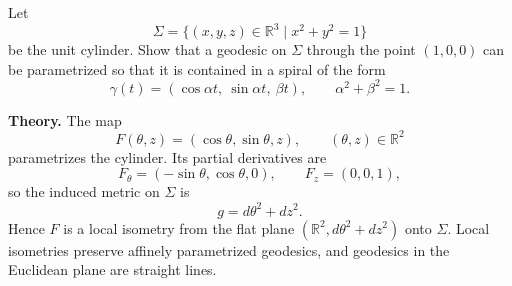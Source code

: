 \begin{problem}
\label{prob:cp-vii-0066}
Let
	\[
	\Sigma=\{(x,y,z)\in\mathbb R^3\mid x^2+y^2=1\}
	\]
	be the unit cylinder. Show that a geodesic on $\Sigma$ through the point $(1,0,0)$
	can be parametrized so that it is contained in a spiral of the form
	\[
	\gamma(t)=(\cos\alpha t,\ \sin\alpha t,\ \beta t),
	\qquad \alpha^2+\beta^2=1.
	\]
	
	\medskip
	\textbf{Theory.}
	The map
	\[
	F(\theta,z) = (\cos\theta,\sin\theta,z),\qquad (\theta,z)\in\mathbb R^2
	\]
	parametrizes the cylinder. Its partial derivatives are
	\[
	F_\theta = (-\sin\theta,\cos\theta,0),\qquad
	F_z = (0,0,1),
	\]
	so the induced metric on $\Sigma$ is
	\[
	g = d\theta^2 + dz^2.
	\]
	Hence $F$ is a local isometry from the flat plane $(\mathbb R^2,d\theta^2+dz^2)$
	onto $\Sigma$. Local isometries preserve affinely parametrized geodesics,
	and geodesics in the Euclidean plane are straight lines.
	
	\medskip
\end{problem}

